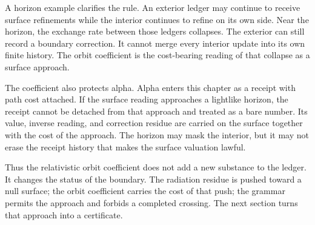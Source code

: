 A horizon example clarifies the rule. An exterior ledger may continue to
receive surface refinements while the interior continues to refine on its
own side. Near the horizon, the exchange rate between those ledgers
collapses. The exterior can still record a boundary correction. It cannot
merge every interior update into its own finite history. The orbit
coefficient is the cost-bearing reading of that collapse as a surface
approach.

The coefficient also protects alpha. Alpha enters this chapter as a receipt
with path cost attached. If the surface reading approaches a lightlike
horizon, the receipt cannot be detached from that approach and treated as a
bare number. Its value, inverse reading, and correction residue are carried
on the surface together with the cost of the approach. The horizon may mask
the interior, but it may not erase the receipt history that makes the
surface valuation lawful.

Thus the relativistic orbit coefficient does not add a new substance to the
ledger. It changes the status of the boundary. The radiation residue is
pushed toward a null surface; the orbit coefficient carries the cost of that
push; the grammar permits the approach and forbids a completed crossing. The
next section turns that approach into a certificate.
